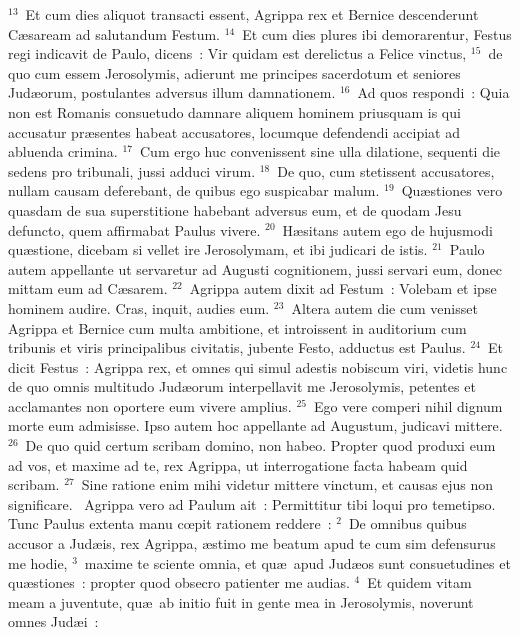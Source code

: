 ${}^{13}$~Et cum dies aliquot transacti essent, Agrippa rex et Bernice descenderunt C\ae saream ad salutandum Festum.
${}^{14}$~Et cum dies plures ibi demorarentur, Festus regi indicavit de Paulo, dicens~: Vir quidam est derelictus a Felice vinctus,
${}^{15}$~de quo cum essem Jerosolymis, adierunt me principes sacerdotum et seniores Jud\ae orum, postulantes adversus illum damnationem.
${}^{16}$~Ad quos respondi~: Quia non est Romanis consuetudo damnare aliquem hominem priusquam is qui accusatur pr\ae sentes habeat accusatores, locumque defendendi accipiat ad abluenda crimina.
${}^{17}$~Cum ergo huc convenissent sine ulla dilatione, sequenti die sedens pro tribunali, jussi adduci virum.
${}^{18}$~De quo, cum stetissent accusatores, nullam causam deferebant, de quibus ego suspicabar malum.
${}^{19}$~Qu\ae stiones vero quasdam de sua superstitione habebant adversus eum, et de quodam Jesu defuncto, quem affirmabat Paulus vivere.
${}^{20}$~H\ae sitans autem ego de hujusmodi qu\ae stione, dicebam si vellet ire Jerosolymam, et ibi judicari de istis.
${}^{21}$~Paulo autem appellante ut servaretur ad Augusti cognitionem, jussi servari eum, donec mittam eum ad C\ae sarem.
${}^{22}$~Agrippa autem dixit ad Festum~: Volebam et ipse hominem audire. Cras, inquit, audies eum.
${}^{23}$~Altera autem die cum venisset Agrippa et Bernice cum multa ambitione, et introissent in auditorium cum tribunis et viris principalibus civitatis, jubente Festo, adductus est Paulus.
${}^{24}$~Et dicit Festus~: Agrippa rex, et omnes qui simul adestis nobiscum viri, videtis hunc de quo omnis multitudo Jud\ae orum interpellavit me Jerosolymis, petentes et acclamantes non oportere eum vivere amplius.
${}^{25}$~Ego vere comperi nihil dignum morte eum admisisse. Ipso autem hoc appellante ad Augustum, judicavi mittere.
${}^{26}$~De quo quid certum scribam domino, non habeo. Propter quod produxi eum ad vos, et maxime ad te, rex Agrippa, ut interrogatione facta habeam quid scribam.
${}^{27}$~Sine ratione enim mihi videtur mittere vinctum, et causas ejus non significare.
~\lettrine[lines=10,image=true,loversize=0.05,lraise=-0.03]{A}{}grippa vero ad Paulum ait~: Permittitur tibi loqui pro temetipso. Tunc Paulus extenta manu cœpit rationem reddere~:
${}^{2}$~De omnibus quibus accusor a Jud\ae is, rex Agrippa, \ae stimo me beatum apud te cum sim defensurus me hodie,
${}^{3}$~maxime te sciente omnia, et qu\ae\ apud Jud\ae os sunt consuetudines et qu\ae stiones~: propter quod obsecro patienter me audias.
${}^{4}$~Et quidem vitam meam a juventute, qu\ae\ ab initio fuit in gente mea in Jerosolymis, noverunt omnes Jud\ae i~:
